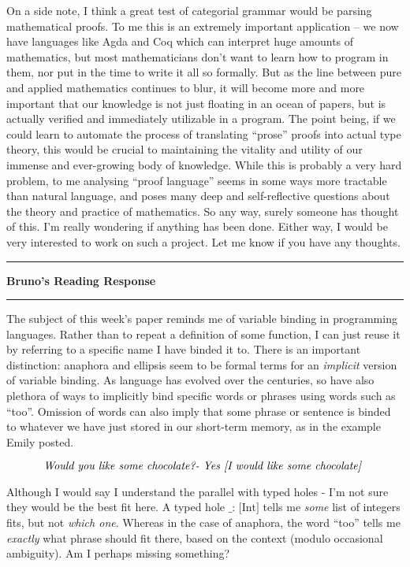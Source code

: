 \documentclass{amsart}
\newcommand{\iam}[1]{
  \vspace{0.25em}
  \hrule
  \vspace{0.25em}
  \textbf{{#1}'s Reading Response}
  \vspace{0.25em}
  \hrule
  \vspace{1em}
}
\begin{document}
On a side note, I think a great test of categorial grammar would be parsing
mathematical proofs. To me this is an extremely important application -- we now
have languages like Agda and Coq which can interpret huge amounts of
mathematics, but most mathematicians don't want to learn how to program in them,
nor put in the time to write it all so formally. But as the line between pure
and applied mathematics continues to blur, it will become more and more
important that our knowledge is not just floating in an ocean of papers, but is
actually verified and immediately utilizable in a program. The point being, if
we could learn to automate the process of translating ``prose'' proofs into
actual type theory, this would be crucial to maintaining the vitality and
utility of our immense and ever-growing body of knowledge. While this is
probably a very hard problem, to me analysing ``proof language'' seems in some
ways more tractable than natural language, and poses many deep and
self-reflective questions about the theory and practice of mathematics. So any
way, surely someone has thought of this. I'm really wondering if anything has
been done. Either way, I would be very interested to work on such a project. Let
me know if you have any thoughts.

\iam{Bruno}

The subject of this week's paper reminds me of variable binding in programming
languages.
Rather than to repeat a definition of some function, I can just reuse it by
referring to a specific name I have binded it to. There is an important
distinction: anaphora and ellipsis seem to be formal terms for an
\textit{implicit} version of variable binding.
As language has evolved over the centuries, so have also plethora of ways to
implicitly bind specific words or phrases using words such as ``too''. Omission
of words can also imply that some phrase or sentence is binded to whatever we have
just stored in our short-term memory, as in the example Emily posted.

  $$\textrm{\emph{Would you like some chocolate?\\
  - Yes [I would like some chocolate] }}$$

Although I would say I understand the parallel with typed holes - I'm not sure they would
be the best fit here. A typed hole $\textrm{\_ : [Int]}$ tells me
\textit{some} list of integers fits, but not \textit{which one}. Whereas in the
case of anaphora, the word ``too'' tells me \textit{exactly} what phrase should
fit there, based on the context (modulo occasional ambiguity). Am I perhaps missing something?
\end{document}
